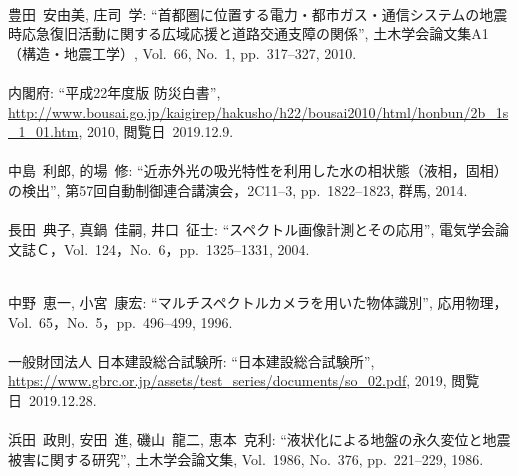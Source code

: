\begin{mythebibliography}{}
\leavevmode \\豊田~安由美, 庄司~学:
\newblock ``首都圏に位置する電力・都市ガス・通信システムの地震時応急復旧活動に関する広域応援と道路交通支障の関係'',
\newblock 土木学会論文集A1（構造・地震工学）, Vol.~66, No.~1, pp.~317--327, 2010.
\\

\leavevmode \\内閣府:
\newblock ``平成22年度版 防災白書'', 
\newblock \url{http://www.bousai.go.jp/kaigirep/hakusho/h22/bousai2010/html/honbun/2b_1s_1_01.htm}, 2010, 
\newblock \mbox{閲覧日 2019.12.9}.
\\

\leavevmode \\中島~利郎, 的場~修:
\newblock ``近赤外光の吸光特性を利用した水の相状態（液相，固相）の検出'',
\newblock 第57回自動制御連合講演会，2C11--3, pp.~1822--1823, 群馬, 2014.
\\

\leavevmode \\長田~典子, 真鍋~佳嗣, 井口~征士:
\newblock ``スペクトル画像計測とその応用'',
\newblock 電気学会論文誌Ｃ，Vol.~124，No.~6，pp.~1325--1331, 2004.
\\

\newpage

\leavevmode \\中野~恵一, 小宮~康宏:
\newblock ``マルチスペクトルカメラを用いた物体識別'',
\newblock 応用物理，Vol.~65，No.~5，pp.~496--499, 1996.
\\

\leavevmode \\一般財団法人 日本建設総合試験所:
\newblock ``日本建設総合試験所'', 
\newblock \url{https://www.gbrc.or.jp/assets/test_series/documents/so_02.pdf}, 2019, 
\newblock \mbox{閲覧日 2019.12.28}.
\\

\leavevmode \\浜田~政則, 安田~進, 磯山~龍二, 恵本~克利:
\newblock ``液状化による地盤の永久変位と地震被害に関する研究'',
\newblock 土木学会論文集, Vol.~1986, No.~376, pp.~221--229, 1986.
\\


\end{mythebibliography}
